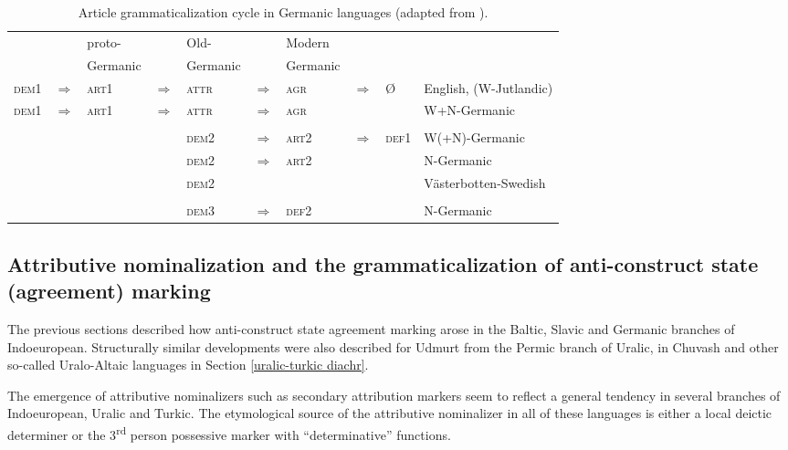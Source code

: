 {\begin{landscape}
\begin{table}
\begin{center}
\begin{footnotesize}
\begin{tabular}[t]{l l l l l l l l l l}
\hline
\hline
&	&proto-& &Old-&	&Modern&&\\
&	&Germanic&	&Germanic&	&Germanic&&\\
\hline							
\textsc{dem1}&$\Rightarrow$&\textsc{art1}&$\Rightarrow$&\textsc{attr}&$\Rightarrow$&\textsc{agr}&$\Rightarrow$&Ø&English, (W-Jutlandic)\\
\textsc{dem1}&$\Rightarrow$&\textsc{art1}&$\Rightarrow$&\textsc{attr}&$\Rightarrow$&\textsc{agr}&&&W+N-Germanic\\
\\
&&&		&\textsc{dem2}&$\Rightarrow$&\textsc{art2}&$\Rightarrow$&\textsc{def1}&W(+N)-Germanic\\
&&&		&\textsc{dem2}&$\Rightarrow$&\textsc{art2}&&&N-Germanic\\
&&&		&\textsc{dem2}&&&&&Västerbotten-Swedish\\
\\
&&&		&\textsc{dem3}&$\Rightarrow$&\textsc{def2}&&&N-Germanic\\
\hline
\hline
\end{tabular}
\end{footnotesize}
\end{center}
\caption[Article grammaticalization cycle in Germanic]{Article grammaticalization cycle in Germanic languages (adapted from \citealt[272]{riesler2006a}).}
\end{table}
\end{landscape}

\subsection[Attributive nominalization and anti-construct state]{Attributive nominalization and the grammaticalization of anti-construct state (agreement) marking}
The previous sections described how anti-construct state agreement marking arose in the Baltic, Slavic and Germanic branches of Indoeuropean. Structurally similar developments were also described for Udmurt from the Permic branch of Uralic, in Chuvash and other so-called Uralo-Altaic languages in Section \ref{uralic-turkic diachr}. 

The emergence of attributive nominalizers such as secondary attribution markers seem to reflect a general tendency in several branches of Indoeuropean, Uralic and Turkic. The etymological source of the attributive nominalizer in all of these languages is either a local deictic determiner or the 3\textsuperscript{rd} person possessive marker with “determinative” functions.

}
